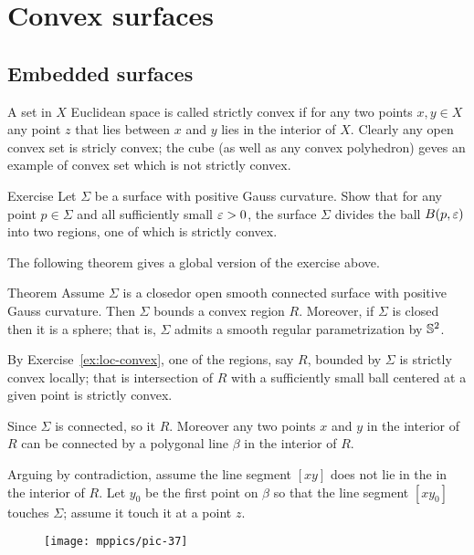 \chapter{Convex surfaces}


\section{Embedded surfaces}
A set in $X$ Euclidean space is called strictly convex if for any two points $x,y\in X$ any point $z$ that lies between $x$ and $y$ lies in the interior of $X$.
Clearly any open convex set is stricly convex;
the cube (as well as any convex polyhedron) geves an example of convex set which is not strictly convex.

\begin{thm}{Exercise}\label{ex:loc-convex}
Let $\Sigma$ be a surface with positive Gauss curvature.
Show that for any point $p\in \Sigma$ and all sufficiently small $\varepsilon>0$,
the surface $\Sigma$ divides the ball $B(p,\varepsilon)$ into two regions, one of which is strictly convex.
\end{thm}

The following theorem gives a global version of the exercise above.

\begin{thm}{Theorem}\label{thm:convex-embedded}
Assume $\Sigma$ is a closedor open smooth connected surface with positive Gauss curvature.
Then $\Sigma$ bounds a convex region $R$.
Moreover, if $\Sigma$ is closed then it is a sphere; that is, $\Sigma$ admits a smooth regular parametrization by $\mathbb{S}^2$.

\end{thm}

By Exercise~\ref{ex:loc-convex}, one of the regions, say $R$, bounded by $\Sigma$ is strictly convex locally;
that is intersection of $R$ with a sufficiently small ball centered at a given point is strictly convex.

Since $\Sigma$ is connected, so it $R$.
Moreover any two points $x$ and $y$ in the interior of $R$ can be connected by a polygonal line $\beta$ in the interior of $R$.


Arguing by contradiction, assume the line segment $[xy]$ does not lie in the   in the interior of $R$.
Let $y_0$ be the first point on $\beta$ so that the line segment $[xy_0]$ touches $\Sigma$; assume it touch it at a point $z$.

\begin{wrapfigure}{r}{43 mm}
\vskip-0mm
\centering
\texttt{[image: mppics/pic-37]}
\vskip-0mm
\end{wrapfigure}

